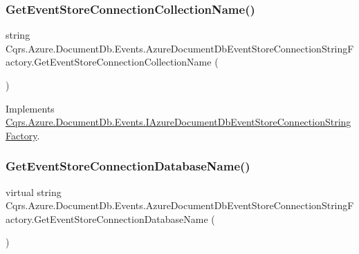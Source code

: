 \subsubsection{\texorpdfstring{Get\+Event\+Store\+Connection\+Collection\+Name()}{GetEventStoreConnectionCollectionName()}}
{\footnotesize\ttfamily string Cqrs.\+Azure.\+Document\+Db.\+Events.\+Azure\+Document\+Db\+Event\+Store\+Connection\+String\+Factory.\+Get\+Event\+Store\+Connection\+Collection\+Name (\begin{DoxyParamCaption}{ }\end{DoxyParamCaption})}



Implements \hyperlink{interfaceCqrs_1_1Azure_1_1DocumentDb_1_1Events_1_1IAzureDocumentDbEventStoreConnectionStringFactory_a4268ad0884bad88528a5eb10292d9d3b_a4268ad0884bad88528a5eb10292d9d3b}{Cqrs.\+Azure.\+Document\+Db.\+Events.\+I\+Azure\+Document\+Db\+Event\+Store\+Connection\+String\+Factory}.

\mbox{\label{classCqrs_1_1Azure_1_1DocumentDb_1_1Events_1_1AzureDocumentDbEventStoreConnectionStringFactory_af243f79315140e1f2c20a5c1695f4fb9_af243f79315140e1f2c20a5c1695f4fb9}} 
\subsubsection{\texorpdfstring{Get\+Event\+Store\+Connection\+Database\+Name()}{GetEventStoreConnectionDatabaseName()}}
{\footnotesize\ttfamily virtual string Cqrs.\+Azure.\+Document\+Db.\+Events.\+Azure\+Document\+Db\+Event\+Store\+Connection\+String\+Factory.\+Get\+Event\+Store\+Connection\+Database\+Name (\begin{DoxyParamCaption}{ }\end{DoxyParamCaption})\hspace{0.3cm}{\ttfamily [virtual]}}



